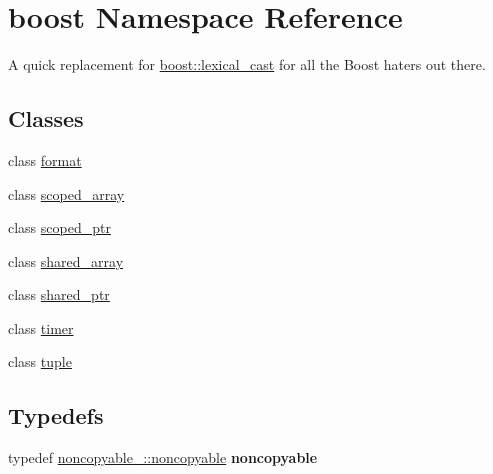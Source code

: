 \hypertarget{namespaceboost}{\section{boost Namespace Reference}
\label{namespaceboost}
}


A quick replacement for \hyperlink{namespaceboost_a19d97ff5320962433a8d0ca7c6e2ad41}{boost\+::lexical\+\_\+cast} for all the Boost haters out there.  


\subsection*{Classes}
\begin{DoxyCompactItemize}
\item 
class \hyperlink{classboost_1_1format}{format}
\item 
class \hyperlink{classboost_1_1scoped__array}{scoped\+\_\+array}
\item 
class \hyperlink{classboost_1_1scoped__ptr}{scoped\+\_\+ptr}
\item 
class \hyperlink{classboost_1_1shared__array}{shared\+\_\+array}
\item 
class \hyperlink{classboost_1_1shared__ptr}{shared\+\_\+ptr}
\item 
class \hyperlink{classboost_1_1timer}{timer}
\item 
class \hyperlink{classboost_1_1tuple}{tuple}
\end{DoxyCompactItemize}
\subsection*{Typedefs}
\begin{DoxyCompactItemize}
\item 
\hypertarget{namespaceboost_a0f7a4af9eddcba0e760e27f920d986d2}{typedef \hyperlink{classboost_1_1noncopyable___1_1noncopyable}{noncopyable\+\_\+\+::noncopyable} {\bfseries noncopyable}}\label{namespaceboost_a0f7a4af9eddcba0e760e27f920d986d2}

\end{DoxyCompactItemize}
